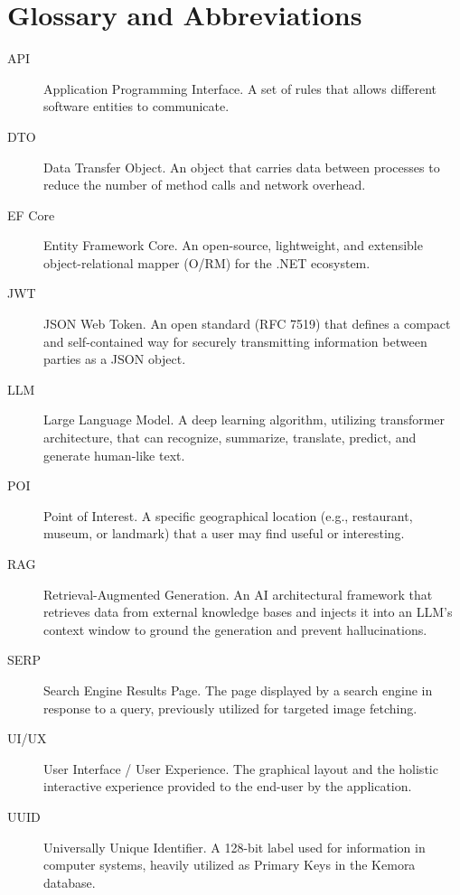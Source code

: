 \chapter*{Glossary and Abbreviations}

\begin{description}
    \item[API] Application Programming Interface. A set of rules that allows different software entities to communicate.
    \item[DTO] Data Transfer Object. An object that carries data between processes to reduce the number of method calls and network overhead.
    \item[EF Core] Entity Framework Core. An open-source, lightweight, and extensible object-relational mapper (O/RM) for the .NET ecosystem.
    \item[JWT] JSON Web Token. An open standard (RFC 7519) that defines a compact and self-contained way for securely transmitting information between parties as a JSON object.
    \item[LLM] Large Language Model. A deep learning algorithm, utilizing transformer architecture, that can recognize, summarize, translate, predict, and generate human-like text.
    \item[POI] Point of Interest. A specific geographical location (e.g., restaurant, museum, or landmark) that a user may find useful or interesting.
    \item[RAG] Retrieval-Augmented Generation. An AI architectural framework that retrieves data from external knowledge bases and injects it into an LLM's context window to ground the generation and prevent hallucinations.
    \item[SERP] Search Engine Results Page. The page displayed by a search engine in response to a query, previously utilized for targeted image fetching.
    \item[UI/UX] User Interface / User Experience. The graphical layout and the holistic interactive experience provided to the end-user by the application.
    \item[UUID] Universally Unique Identifier. A 128-bit label used for information in computer systems, heavily utilized as Primary Keys in the Kemora database.
\end{description}
